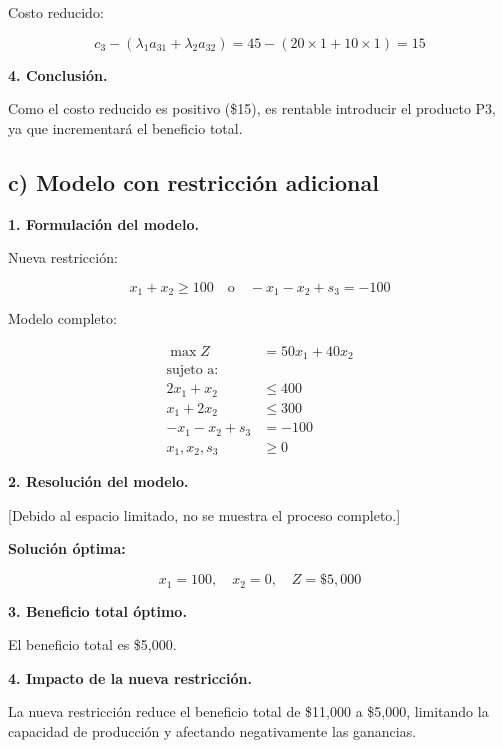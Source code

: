 \documentclass{article}
\begin{document}
Costo reducido:

\[
c_3 - (\lambda_1 a_{31} + \lambda_2 a_{32}) = 45 - (20 \times 1 + 10 \times 1) = 15
\]

\textbf{4. Conclusión.}

Como el costo reducido es positivo (\$15), es rentable introducir el producto P3, ya que incrementará el beneficio total.

\subsection*{c) Modelo con restricción adicional}

\textbf{1. Formulación del modelo.}

Nueva restricción:

\[
x_1 + x_2 \geq 100 \quad \text{o} \quad -x_1 - x_2 + s_3 = -100
\]

Modelo completo:

\[
\begin{aligned}
\max Z &= 50x_1 + 40x_2 \\
\text{sujeto a:} \\
2x_1 + x_2 &\leq 400 \\
x_1 + 2x_2 &\leq 300 \\
-x_1 - x_2 + s_3 &= -100 \\
x_1, x_2, s_3 &\geq 0
\end{aligned}
\]

\textbf{2. Resolución del modelo.}

[Debido al espacio limitado, no se muestra el proceso completo.]

\textbf{Solución óptima:}

\[
x_1 = 100, \quad x_2 = 0, \quad Z = \$5,000
\]

\textbf{3. Beneficio total óptimo.}

El beneficio total es \$5,000.

\textbf{4. Impacto de la nueva restricción.}

La nueva restricción reduce el beneficio total de \$11,000 a \$5,000, limitando la capacidad de producción y afectando negativamente las ganancias.
\end{document}
